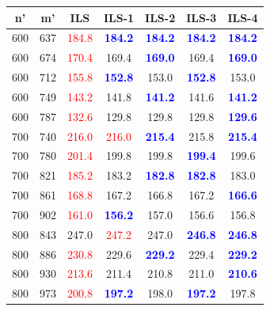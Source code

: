 
\begin{tabular}{|cc|c|cccc|}
\hline
\rowcolor{gray!30} \textbf{n'} &  \textbf{m'} &  \textbf{ILS} &  \textbf{ILS-1} &  \textbf{ILS-2} &  \textbf{ILS-3} &  \textbf{ILS-4}\\ \hline
600 & 637 & \textcolor{red}{184.8} & \textbf{\textcolor{blue}{184.2}} & \textbf{\textcolor{blue}{184.2}} & \textbf{\textcolor{blue}{184.2}} & \textbf{\textcolor{blue}{184.2}}\\
600 & 674 & \textcolor{red}{170.4} & 169.4 & \textbf{\textcolor{blue}{169.0}} & 169.4 & \textbf{\textcolor{blue}{169.0}}\\
600 & 712 & \textcolor{red}{155.8} & \textbf{\textcolor{blue}{152.8}} & 153.0 & \textbf{\textcolor{blue}{152.8}} & 153.0\\
600 & 749 & \textcolor{red}{143.2} & 141.8 & \textbf{\textcolor{blue}{141.2}} & 141.6 & \textbf{\textcolor{blue}{141.2}}\\
600 & 787 & \textcolor{red}{132.6} & 129.8 & 129.8 & 129.8 & \textbf{\textcolor{blue}{129.6}}\\
700 & 740 & \textcolor{red}{216.0} & \textcolor{red}{216.0} & \textbf{\textcolor{blue}{215.4}} & 215.8 & \textbf{\textcolor{blue}{215.4}}\\
700 & 780 & \textcolor{red}{201.4} & 199.8 & 199.8 & \textbf{\textcolor{blue}{199.4}} & 199.6\\
700 & 821 & \textcolor{red}{185.2} & 183.2 & \textbf{\textcolor{blue}{182.8}} & \textbf{\textcolor{blue}{182.8}} & 183.0\\
700 & 861 & \textcolor{red}{168.8} & 167.2 & 166.8 & 167.2 & \textbf{\textcolor{blue}{166.6}}\\
700 & 902 & \textcolor{red}{161.0} & \textbf{\textcolor{blue}{156.2}} & 157.0 & 156.6 & 156.8\\
800 & 843 & 247.0 & \textcolor{red}{247.2} & 247.0 & \textbf{\textcolor{blue}{246.8}} & \textbf{\textcolor{blue}{246.8}}\\
800 & 886 & \textcolor{red}{230.8} & 229.6 & \textbf{\textcolor{blue}{229.2}} & 229.4 & \textbf{\textcolor{blue}{229.2}}\\
800 & 930 & \textcolor{red}{213.6} & 211.4 & 210.8 & 211.0 & \textbf{\textcolor{blue}{210.6}}\\
800 & 973 & \textcolor{red}{200.8} & \textbf{\textcolor{blue}{197.2}} & 198.0 & \textbf{\textcolor{blue}{197.2}} & 197.8\\

\end{tabular}

